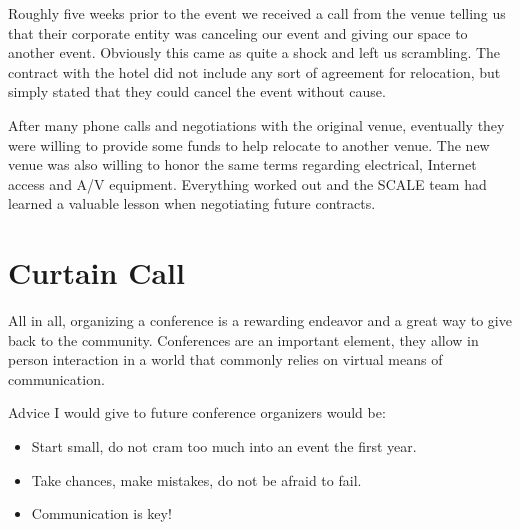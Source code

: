 Roughly five weeks prior to the event we received a call from the venue telling
us that their corporate entity was canceling our event and giving our space to
another event. Obviously this came as quite a shock and left us scrambling. 
The contract with the hotel did not include any sort of agreement for
relocation, but simply stated that they could cancel the event without cause.

After many phone calls and negotiations with the original venue, eventually they
were willing to provide some funds to help relocate to another venue. The new
venue was also willing to honor the same terms regarding electrical, Internet
access and A/V equipment. Everything worked out and the SCALE team had learned
a valuable lesson when negotiating future contracts.

\section*{Curtain Call}

All in all, organizing a conference is a rewarding endeavor and a great way to
give back to the community. Conferences are an important element, they allow in
person interaction in a world that commonly relies on virtual means of
communication.

Advice I would give to future conference organizers would be:
\begin{itemize}
 \item Start small, do not cram too much into an event the first year.
 \item Take chances, make mistakes, do not be afraid to fail.
 \item Communication is key!
\end{itemize}
